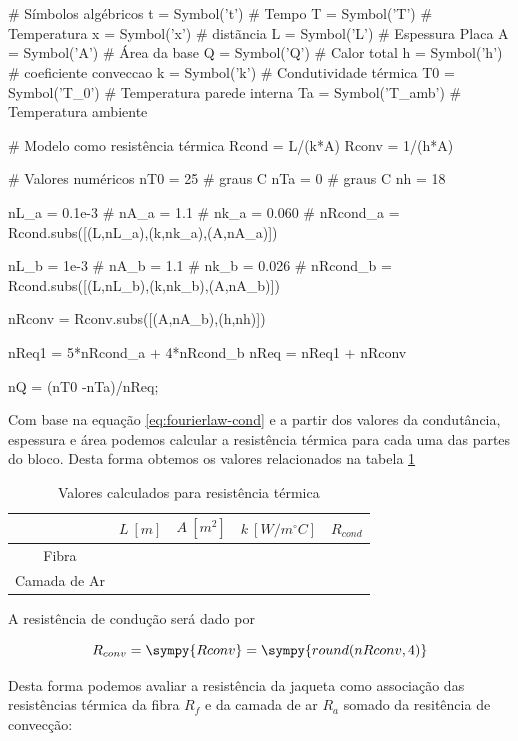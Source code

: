 \documentclass[a4paper,11pt]{article}
\newcommand{\npy}[1]{\sympy{round(n#1,4)}}
\begin{document}
\section{} %
\begin{sympycode}
# Símbolos algébricos
t = Symbol('t') # Tempo
T = Symbol('T') # Temperatura
x = Symbol('x') # distãncia
L = Symbol('L') # Espessura Placa
A = Symbol('A') # Área da base
Q = Symbol('Q') # Calor total
h = Symbol('h') # coeficiente conveccao
k = Symbol('k') # Condutividade térmica
T0 = Symbol('T_0') # Temperatura parede interna
Ta = Symbol('T_amb') # Temperatura ambiente

# Modelo como resistência térmica
Rcond = L/(k*A)
Rconv = 1/(h*A)

# Valores numéricos
nT0 = 25 # graus C
nTa = 0 # graus C
nh = 18

nL_a = 0.1e-3 #
nA_a = 1.1 #
nk_a = 0.060 #
nRcond_a = Rcond.subs([(L,nL_a),(k,nk_a),(A,nA_a)])

nL_b = 1e-3 #
nA_b = 1.1 #
nk_b = 0.026 #
nRcond_b = Rcond.subs([(L,nL_b),(k,nk_b),(A,nA_b)])

nRconv = Rconv.subs([(A,nA_b),(h,nh)])

nReq1 = 5*nRcond_a + 4*nRcond_b
nReq = nReq1 + nRconv

nQ = (nT0 -nTa)/nReq;
\end{sympycode}

Com base na equação \ref{eq:fourierlaw-cond} e a partir dos valores da condutância, espessura e área podemos calcular a resistência térmica para cada uma das partes do bloco. Desta forma obtemos os valores relacionados na tabela \ref{tab:q10.resistence}

\begin{table}[H]
\centering
\begin{tabular}{|cccc|c|}
\hline
 &  $L \ [m]$ &$A\ [m^2]$ & $k \ [W/m ^\circ C]$ & $R_{cond}$\\
\hline
Fibra & \npy{L_a} & \npy{A_a} & \npy{k_a} & \npy{Rcond_a} \\
Camada de Ar & \npy{L_b} & \npy{A_b} & \npy{k_b} & \npy{Rcond_b} \\
\hline
\end{tabular}
\caption{Valores calculados para resistência térmica}
\label{tab:q10.resistence}
\end{table}

A resistência de condução será dado por

$$R_{conv} = \sympy{Rconv} = \npy{Rconv}$$

Desta forma podemos avaliar a resistência da jaqueta como associação das resistências térmica da fibra $R_f$ e da camada de ar $R_a$ somado da resitência de convecção:
\end{document}
